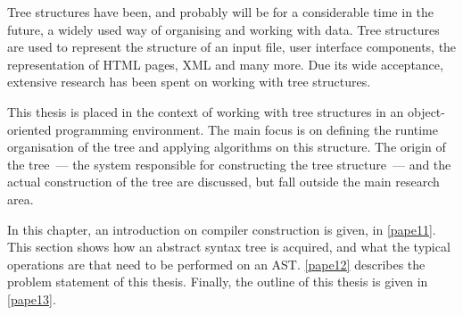 \secdown

Tree structures have been, and probably will be for a considerable time in the
future, a widely used way of organising and working with data. Tree structures
are used to represent the structure of an input file, user interface components, the representation of HTML
pages, XML and many more. Due its wide
acceptance, extensive research has been spent on working with tree structures.

This thesis is placed in the context of working with tree structures in an
object-oriented programming environment. The main focus is on defining the
runtime organisation of the tree and applying algorithms on this structure. The
origin of the tree\ --- the system responsible for constructing the tree
structure\ --- and the actual construction of the tree are discussed, but fall
outside the main research area.

In this chapter, an introduction on compiler construction is given, in
\ref{pape11}. This section shows how an abstract syntax tree is acquired, and
what the typical operations are that need to be performed on an AST.
\ref{pape12} describes the problem statement of this thesis. Finally, the
outline of this thesis is given in \ref{pape13}.

\label{pape11}\secdown




\secup

\label{pape12}

\label{pape13}

\secup